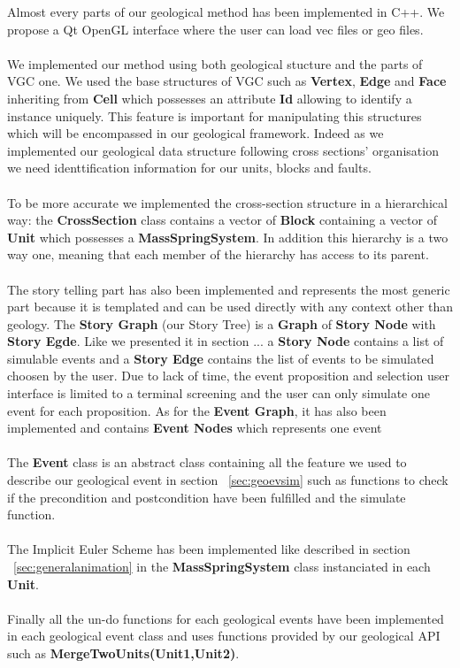 \documentclass[12pt, a4paper]{report} %
\begin{document}
Almost every parts of our geological method has been implemented in C++. We propose a Qt OpenGL interface where the user can load vec files or geo files.\\\\
We implemented our method using both geological stucture and the parts of VGC one. We used the base structures of VGC such as \textbf{Vertex}, \textbf{Edge} and \textbf{Face} inheriting from \textbf{Cell} which possesses an attribute \textbf{Id} allowing to identify a instance uniquely. This feature is important for manipulating this structures which will be encompassed in our geological framework. Indeed as we implemented our geological data structure following cross sections' organisation we need identtification information for our units, blocks and faults.\\\\
To be more accurate we implemented the cross-section structure in a hierarchical way: the \textbf{CrossSection} class contains a vector of \textbf{Block} containing a vector of \textbf{Unit} which possesses a \textbf{MassSpringSystem}. In addition this hierarchy is a two way one, meaning that each member of the hierarchy has access to its parent.\\\\
The story telling part has also been implemented and represents the most generic part because it is templated and can be used directly with any context other than geology. The \textbf{Story Graph} (our Story Tree) is a \textbf{Graph} of \textbf{Story Node} with \textbf{Story Egde}. Like we presented it in section ... a \textbf{Story Node} contains a list of simulable events and a \textbf{Story Edge} contains the list of events to be simulated choosen by the user.
Due to lack of time, the event proposition and selection user interface is limited to a terminal screening and the user can only simulate one event for each proposition. As for the \textbf{Event Graph}, it has also been implemented and contains \textbf{Event Nodes} which represents one event\\\\
The \textbf{Event} class is an abstract class containing all the feature we used to describe our geological event in section ~\ref{sec:geoevsim} such as functions to check if the precondition and postcondition have been fulfilled and the simulate function.\\\\
The Implicit Euler Scheme has been implemented like described in section ~\ref{sec:generalanimation} in the \textbf{MassSpringSystem} class instanciated in each \textbf{Unit}.\\\\
Finally all the un-do functions for each geological events have been implemented in each geological event class and uses functions provided by our geological API such as \textbf{MergeTwoUnits(Unit1,Unit2)}. 
\end{document}
